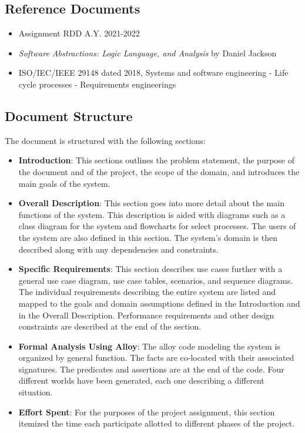 \subsection{Reference Documents}
\begin{itemize}
\item Assignment RDD A.Y. 2021-2022
\item \textit{Software Abstractions: Logic Language, and Analysis} by Daniel Jackson
\item ISO/IEC/IEEE 29148 dated 2018, Systems and software engineering - Life cycle processes - Requirements engineerings
\end{itemize}



\subsection{Document Structure}
The document is structured with the following sections:
\begin{itemize}
\item \textbf{Introduction}: This sections outlines the problem statement, the purpose of the document and of the project, the scope of the domain, and introduces the main goals of the system. 
\item \textbf{Overall Description}: This section goes into more detail about the main functions of the system. This description is aided with diagrams such as a class diagram for the system and flowcharts for select processes. The users of the system are also defined in this section. The system's domain is then described along with any dependencies and constraints. 
\item \textbf{Specific Requirements}: This section describes use cases further with a general use case diagram, use case tables, scenarios, and sequence diagrams. The individual requirements describing the entire system are listed and mapped to the goals and domain assumptions defined in the Introduction and in the Overall Description. Performance requirements and other design constraints are described at the end of the section.
\item \textbf{Formal Analysis Using Alloy}: The alloy code modeling the system is organized by general function. The facts are co-located with their associated signatures. The predicates and assertions are at the end of the code. Four different worlds have been generated, each one describing a different situation.
\item \textbf{Effort Spent}: For the purposes of the project assignment, this section itemized the time each participate allotted to different phases of the project. 
\end{itemize}


